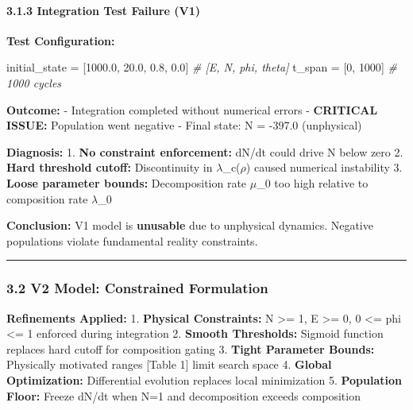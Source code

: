 \documentclass[
]{article}
\newenvironment{Shaded}{}{}
\newcommand{\CommentTok}[1]{\textcolor[rgb]{0.38,0.63,0.69}{\textit{#1}}}
\newcommand{\DecValTok}[1]{\textcolor[rgb]{0.25,0.63,0.44}{#1}}
\newcommand{\FloatTok}[1]{\textcolor[rgb]{0.25,0.63,0.44}{#1}}
\newcommand{\NormalTok}[1]{#1}
\newcommand{\OperatorTok}[1]{\textcolor[rgb]{0.40,0.40,0.40}{#1}}
\begin{document}
\paragraph{3.1.3 Integration Test Failure
(V1)}\label{integration-test-failure-v1}

\textbf{Test Configuration:}

\begin{Shaded}
\begin{Highlighting}[]
\NormalTok{initial\_state }\OperatorTok{=}\NormalTok{ [}\FloatTok{1000.0}\NormalTok{, }\FloatTok{20.0}\NormalTok{, }\FloatTok{0.8}\NormalTok{, }\FloatTok{0.0}\NormalTok{]  }\CommentTok{\# [E, N, phi, theta]}
\NormalTok{t\_span }\OperatorTok{=}\NormalTok{ [}\DecValTok{0}\NormalTok{, }\DecValTok{1000}\NormalTok{]  }\CommentTok{\# 1000 cycles}
\end{Highlighting}
\end{Shaded}

\textbf{Outcome:} - Integration completed without numerical errors -
\textbf{CRITICAL ISSUE:} Population went negative - Final state: N =
-397.0 (unphysical)

\textbf{Diagnosis:} 1. \textbf{No constraint enforcement:} dN/dt could
drive N below zero 2. \textbf{Hard threshold cutoff:} Discontinuity in
$\lambda$\_c($\rho$) caused numerical instability 3. \textbf{Loose parameter bounds:}
Decomposition rate $\mu$\_0 too high relative to composition rate $\lambda$\_0

\textbf{Conclusion:} V1 model is \textbf{unusable} due to unphysical
dynamics. Negative populations violate fundamental reality constraints.

\begin{center}\rule{0.5\linewidth}{0.5pt}\end{center}

\subsubsection{3.2 V2 Model: Constrained
Formulation}\label{v2-model-constrained-formulation}

\textbf{Refinements Applied:} 1. \textbf{Physical Constraints:} N
\textgreater= 1, E \textgreater= 0, 0 \textless= phi \textless= 1
enforced during integration 2. \textbf{Smooth Thresholds:} Sigmoid
function replaces hard cutoff for composition gating 3. \textbf{Tight
Parameter Bounds:} Physically motivated ranges {[}Table 1{]} limit
search space 4. \textbf{Global Optimization:} Differential evolution
replaces local minimization 5. \textbf{Population Floor:} Freeze dN/dt
when N=1 and decomposition exceeds composition
\end{document}
